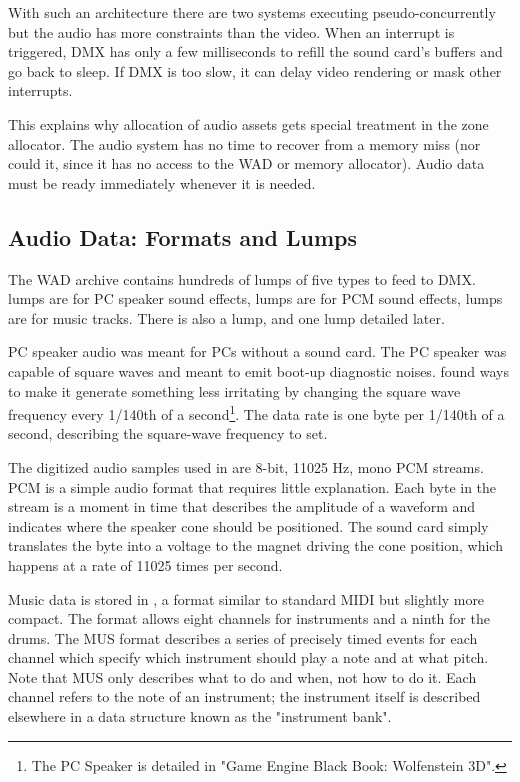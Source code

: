 
With such an architecture there are two systems executing pseudo-concurrently but the audio has more constraints than the video. When an interrupt is triggered, DMX has only a few milliseconds to refill the sound card's buffers and go back to sleep. If DMX is too slow, it can delay video rendering or mask other interrupts.\\
\par
 This explains why allocation of audio assets gets special treatment in the zone allocator. The audio system has no time to recover from a memory miss (nor could it, since it has no access to the WAD or memory allocator). Audio data must be ready immediately whenever it is needed.

\subsection{Audio Data: Formats and Lumps}
The WAD archive contains hundreds of lumps of five types to feed to DMX.  lumps are for PC speaker sound effects,  lumps are for PCM sound effects,  lumps are for music tracks. There is also a  lump, and one  lump detailed later.\\
\par
PC speaker audio was meant for PCs without a sound card. The PC speaker was capable of square waves and meant to emit boot-up diagnostic noises. \doom{} found ways to make it generate something less irritating by changing the square wave frequency every 1/140th of a second\footnote{The PC Speaker is detailed in "Game Engine Black Book: Wolfenstein 3D".}. The data rate is one byte per 1/140th of a second, describing the square-wave frequency to set.\\
\par
The digitized audio samples used in \doom{} are 8-bit, 11025 Hz, mono PCM streams. PCM is a simple audio format that requires little explanation. Each byte in the stream is a moment in time that describes the amplitude of a waveform and indicates where the speaker cone should be positioned. The sound card simply translates the byte into a voltage to the magnet driving the cone position, which happens at a rate of 11025 times per second.\\
\par
Music data is stored in , a format similar to standard MIDI but slightly more compact. The format allows eight channels for instruments and a ninth for the drums. The MUS format describes a series of precisely timed events for each channel which specify which instrument should play a note and at what pitch. Note that MUS only describes what to do and when, not how to do it. Each channel refers to the note of an instrument; the instrument itself is described elsewhere in a data structure known as the "instrument bank".\\
